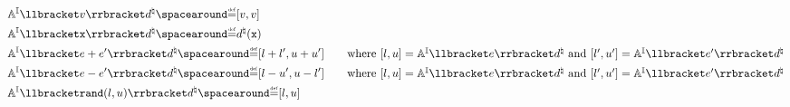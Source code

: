 \begin{description}
{\begin{align*}
    \end{align*}
  }
  \begin{align*}
    &\intervalaexp \semanticsof{\defvalue}\defabstractvalue \DefeQ \interval{\defvalue}{\defvalue} \\
    &\intervalaexp \semanticsof{\defvariable}\defabstractvalue \DefeQ \defabstractvalue(\defvariable) \\
    &\intervalaexp \semanticsof{\defaexp + \defaexp'} \defabstractvalue \DefeQ \interval{l + l'}{u + u'} \tag*{where $\interval{l}{u} = \intervalaexp\semanticsof{\defaexp}\defabstractvalue$ and $ \interval{l'}{u'} = \intervalaexp\semanticsof{\defaexp'}\defabstractvalue$} \\
    &\intervalaexp \semanticsof{\defaexp - \defaexp'} \defabstractvalue \DefeQ \interval{l - u'}{u - l'} \tag*{where $\interval{l}{u} = \intervalaexp\semanticsof{\defaexp}\defabstractvalue$ and $ \interval{l'}{u'} = \intervalaexp\semanticsof{\defaexp'}\defabstractvalue$} \\
    &\intervalaexp \semanticsof{\randval(l, u)}\defabstractvalue \DefeQ \interval{l}{u}

\end{align*}
\end{description}
